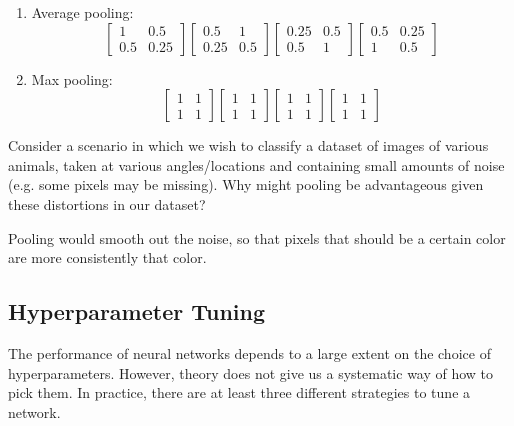 \begin{subsolution}
\begin{enumerate}
    \item Average pooling:
$$
\begin{bmatrix}
  1 & 0.5 \\
  0.5 & 0.25
\end{bmatrix}
%
\begin{bmatrix}
  0.5 & 1 \\
  0.25 & 0.5
\end{bmatrix}
%
\begin{bmatrix}
  0.25 & 0.5 \\
  0.5 & 1
\end{bmatrix}
%
\begin{bmatrix}
  0.5 & 0.25 \\
  1 & 0.5
\end{bmatrix}
$$

    \item Max pooling:
$$
\begin{bmatrix}
  1 & 1 \\
  1 & 1
\end{bmatrix}
%
\begin{bmatrix}
  1 & 1 \\
  1 & 1
\end{bmatrix}
%
\begin{bmatrix}
  1 & 1 \\
  1 & 1
\end{bmatrix}
%
\begin{bmatrix}
  1 & 1 \\
  1 & 1
\end{bmatrix}
$$
\end{enumerate}
\end{subsolution}


\problem[4]

Consider a scenario in which we wish to classify a dataset of images of various animals, taken at various angles/locations and containing small amounts of noise (e.g. some pixels may be missing). Why might pooling be advantageous given these distortions in our dataset?

\begin{subsolution}
  Pooling would smooth out the noise, so that pixels that should be a certain color are more consistently that color.
\end{subsolution}

\subsection{Hyperparameter Tuning}
The performance of neural networks depends to a large extent on the choice of hyperparameters. However, theory does not give us a systematic way of how to pick them. In practice, there are at least three different strategies to tune a network.

